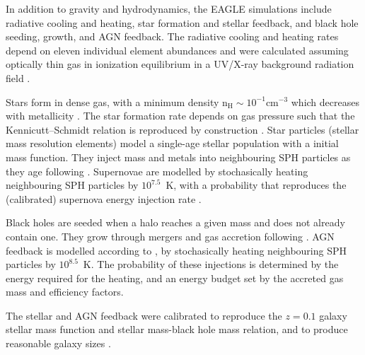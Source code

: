 \documentclass[fleqn,usenatbib]{mnras}
\begin{document}
In addition to gravity and hydrodynamics, the EAGLE simulations include radiative cooling and heating, star formation and stellar feedback, and black hole seeding, growth, and AGN feedback. The radiative cooling and heating rates depend on eleven individual element abundances and were calculated assuming optically thin gas in ionization equilibrium in a \citet{Haardt2001} UV/X-ray background radiation field \citep{Wiersma2009a}. 

Stars form in dense gas, with a minimum density $\mathrm{n}_{\mathrm{H}} \sim 10^{-1} \mathrm{cm}^{-3}$ which decreases with metallicity \citep{Schaye2004}. The star formation rate depends on gas pressure such that the Kennicutt–Schmidt relation is reproduced by construction \citep{Schaye2008}. Star particles (stellar mass resolution elements) model a single-age stellar population with a \citet{Chabrier2003} initial mass function. They inject mass and metals into neighbouring SPH particles as they age following \citet{Wiersma2009}. Supernovae are modelled by stochasically heating neighbouring SPH particles by $10^{7.5}$~K, with a probability that reproduces the (calibrated) supernova energy injection rate \citep{DallaVecchia2012}. 

Black holes are seeded when a halo reaches a given mass and does not already contain one. They grow through mergers and gas accretion following \citet{Rosas-Guevara2015}. AGN feedback is modelled according to \citet{Booth2009}, by stochasically heating neighbouring SPH particles by $10^{8.5}$~K. The probability of these injections is determined by the energy required for the heating, and an energy budget set by the accreted gas mass and efficiency factors.

The stellar and AGN feedback were calibrated to reproduce the $z=0.1$ galaxy stellar mass function and stellar mass-black hole mass relation, and to produce reasonable galaxy sizes \citep{Crain2015}. 
\end{document}
